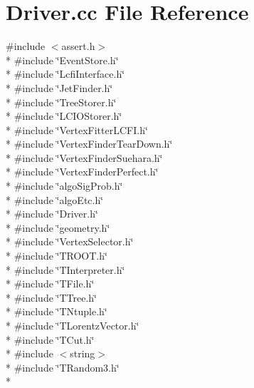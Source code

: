 \section{Driver.\-cc File Reference}
\label{Driver_8cc}
{\ttfamily \#include $<$assert.\-h$>$}\\*
{\ttfamily \#include \char`\"{}Event\-Store.\-h\char`\"{}}\\*
{\ttfamily \#include \char`\"{}Lcfi\-Interface.\-h\char`\"{}}\\*
{\ttfamily \#include \char`\"{}Jet\-Finder.\-h\char`\"{}}\\*
{\ttfamily \#include \char`\"{}Tree\-Storer.\-h\char`\"{}}\\*
{\ttfamily \#include \char`\"{}L\-C\-I\-O\-Storer.\-h\char`\"{}}\\*
{\ttfamily \#include \char`\"{}Vertex\-Fitter\-L\-C\-F\-I.\-h\char`\"{}}\\*
{\ttfamily \#include \char`\"{}Vertex\-Finder\-Tear\-Down.\-h\char`\"{}}\\*
{\ttfamily \#include \char`\"{}Vertex\-Finder\-Suehara.\-h\char`\"{}}\\*
{\ttfamily \#include \char`\"{}Vertex\-Finder\-Perfect.\-h\char`\"{}}\\*
{\ttfamily \#include \char`\"{}algo\-Sig\-Prob.\-h\char`\"{}}\\*
{\ttfamily \#include \char`\"{}algo\-Etc.\-h\char`\"{}}\\*
{\ttfamily \#include \char`\"{}Driver.\-h\char`\"{}}\\*
{\ttfamily \#include \char`\"{}geometry.\-h\char`\"{}}\\*
{\ttfamily \#include \char`\"{}Vertex\-Selector.\-h\char`\"{}}\\*
{\ttfamily \#include \char`\"{}T\-R\-O\-O\-T.\-h\char`\"{}}\\*
{\ttfamily \#include \char`\"{}T\-Interpreter.\-h\char`\"{}}\\*
{\ttfamily \#include \char`\"{}T\-File.\-h\char`\"{}}\\*
{\ttfamily \#include \char`\"{}T\-Tree.\-h\char`\"{}}\\*
{\ttfamily \#include \char`\"{}T\-Ntuple.\-h\char`\"{}}\\*
{\ttfamily \#include \char`\"{}T\-Lorentz\-Vector.\-h\char`\"{}}\\*
{\ttfamily \#include \char`\"{}T\-Cut.\-h\char`\"{}}\\*
{\ttfamily \#include $<$string$>$}\\*
{\ttfamily \#include \char`\"{}T\-Random3.\-h\char`\"{}}\\*
